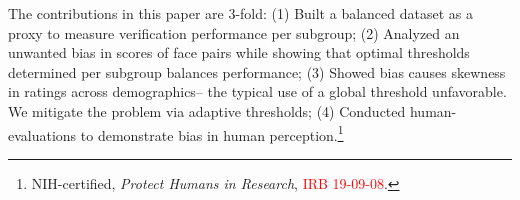 \documentclass[10pt,twocolumn,letterpaper]{article}
\begin{document}
    
    The contributions in this paper are 3-fold: (1) Built a balanced dataset as a proxy to measure verification performance per subgroup; (2) Analyzed an unwanted bias in scores of face pairs while showing that optimal thresholds determined per subgroup balances performance; (3) Showed bias causes skewness in ratings across demographics-- the typical use of a global threshold unfavorable. We mitigate the problem via adaptive thresholds; (4) Conducted human-evaluations to demonstrate bias in human perception.\footnote{NIH-certified, \textit{Protect Humans in Research}, \textcolor{red}{IRB 19-09-08}.}
\end{document}
